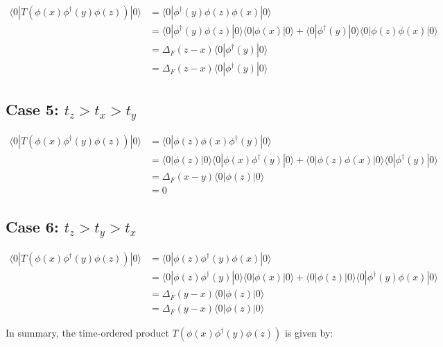 {\begin{align*}
\langle 0 | T(\phi(x) \phi^\dagger(y) \phi(z)) | 0 \rangle &= \langle 0 | \phi^\dagger(y) \phi(z) \phi(x) | 0 \rangle \\
&= \langle 0 | \phi^\dagger(y) \phi(z) | 0 \rangle \langle 0 | \phi(x) | 0 \rangle + \langle 0 | \phi^\dagger(y) | 0 \rangle \langle 0 | \phi(z) \phi(x) | 0 \rangle \\
&= \Delta_F(z - x) \langle 0 | \phi^\dagger(y) | 0 \rangle \\
&= \Delta_F(z - x) \langle 0 | \phi^\dagger(y) | 0 \rangle
\end{align*}

\subsection*{Case 5: \( t_z > t_x > t_y \)}

\begin{align*}
\langle 0 | T(\phi(x) \phi^\dagger(y) \phi(z)) | 0 \rangle &= \langle 0 | \phi(z) \phi(x) \phi^\dagger(y) | 0 \rangle \\
&= \langle 0 | \phi(z) | 0 \rangle \langle 0 | \phi(x) \phi^\dagger(y) | 0 \rangle + \langle 0 | \phi(z) \phi(x) | 0 \rangle \langle 0 | \phi^\dagger(y) | 0 \rangle \\
&= \Delta_F(x - y) \langle 0 | \phi(z) | 0 \rangle \\
&= 0
\end{align*}

\subsection*{Case 6: \( t_z > t_y > t_x \)}

\begin{align*}
\langle 0 | T(\phi(x) \phi^\dagger(y) \phi(z)) | 0 \rangle &= \langle 0 | \phi(z) \phi^\dagger(y) \phi(x) | 0 \rangle \\
&= \langle 0 | \phi(z) \phi^\dagger(y) | 0 \rangle \langle 0 | \phi(x) | 0 \rangle + \langle 0 | \phi(z) | 0 \rangle \langle 0 | \phi^\dagger(y) \phi(x) | 0 \rangle \\
&= \Delta_F(y - x) \langle 0 | \phi(z) | 0 \rangle \\
&= \Delta_F(y - x) \langle 0 | \phi(z) | 0 \rangle
\end{align*}

In summary, the time-ordered product \( T(\phi(x) \phi^\dagger(y) \phi(z)) \) is given by:

}
